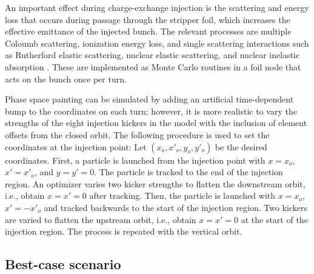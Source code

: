 An important effect during charge-exchange injection is the scattering and energy loss that occurs during passage through the stripper foil, which increases the effective emittance of the injected bunch. The relevant processes are multiple Coloumb scattering, ionization energy loss, and single scattering interactions such as Rutherford elastic scattering, nuclear elastic scattering, and nuclear inelastic absorption \cite{Chao2012, Cousineau2003}. These are implemented as Monte Carlo routines in a foil node that acts on the bunch once per turn.

Phase space painting can be simulated by adding an artificial time-dependent bump to the coordinates on each turn; however, it is more realistic to vary the strengths of the eight injection kickers in the model with the inclusion of element offsets from the closed orbit. The following procedure is used to set the coordinates at the injection point: Let $(x_o, x'_o, y_o, y'_o)$ be the desired coordinates. First, a particle is launched from the injection point with $x = x_o$, $x' = x'_o$, and $y = y' = 0$. The particle is tracked to the end of the injection region. An optimizer varies two kicker strengths to flatten the downstream orbit, i.e., obtain $x = x' = 0$ after tracking. Then, the particle is launched with $x = x_o$, $x' = -x'_o$ and tracked backwards to the start of the injection region. Two kickers are varied to flatten the upstream orbit, i.e., obtain $x = x' = 0$ at the start of the injection region. The process is repeated with the vertical orbit.


\subsection{Best-case scenario}

